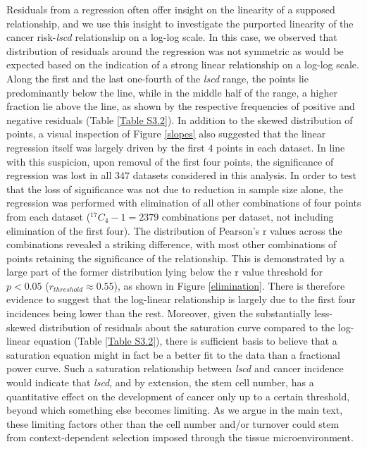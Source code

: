 \documentclass[12pt,onecolumn,twoside]{article}
\begin{document}
		Residuals from a regression often offer insight on the linearity of a supposed relationship, and we use this insight to investigate the purported linearity of the cancer risk-\textit{lscd} relationship on a log-log scale. In this case, we observed that distribution of residuals around the regression was not symmetric as would be expected based on the indication of a strong linear relationship on a log-log scale. Along the first and the last one-fourth of the \textit{lscd} range, the points lie predominantly below the line, while in the middle half of the range, a higher fraction lie above the line, as shown by the respective frequencies of positive and negative residuals (Table \ref{Table S3.2}). In addition to the skewed distribution of points, a visual inspection of Figure \ref{slopes} also suggested that the linear regression itself was largely driven by the first $4$ points in each dataset. In line with this suspicion, upon removal of the first four points, the significance of regression was lost in all $347$ datasets considered in this analysis. In order to test that the loss of significance was not due to reduction in sample size alone, the regression was performed with elimination of all other combinations of four points from each dataset ($^{17}C_{4}-1=2379$ combinations per dataset, not including elimination of the first four). The distribution of Pearson's r values across the combinations revealed a striking difference, with most other combinations of points retaining the significance of the relationship. This is demonstrated by a large part of the former distribution lying below the r value threshold for $p<0.05$ ($r_{threshold}\approx0.55$), as shown in Figure \ref{elimination}. There is therefore evidence to suggest that the log-linear relationship is largely due to the first four incidences being lower than the rest. Moreover, given the substantially less-skewed distribution of residuals about the saturation curve compared to the log-linear equation (Table \ref{Table S3.2}), there is sufficient basis to believe that a saturation equation might in fact be a better fit to the data than a fractional power curve. Such a saturation relationship between \textit{lscd} and cancer incidence  would indicate that \textit{lscd}, and by extension, the stem cell number, has a quantitative effect on the development of cancer only up to a certain threshold, beyond which something else becomes limiting. As we argue in the main text, these limiting factors other than the cell number and/or turnover could stem from context-dependent selection imposed through the tissue microenvironment.
\end{document}
